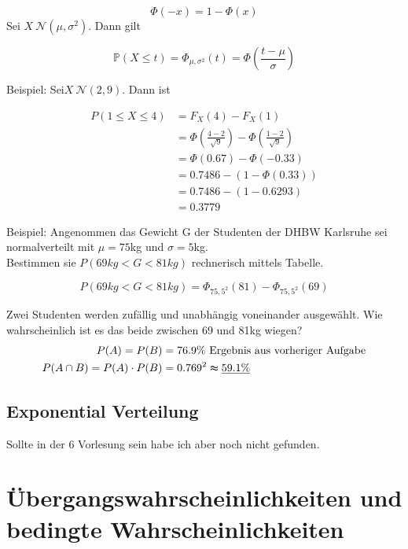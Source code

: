 \[\Phi(-x)=1-\Phi(x)\]
Sei $X~\mathcal{N} (\mu,\sigma^2)$. Dann gilt

\[\mathbb{P} (X\leq t)=\Phi_{\mu ,\sigma ^2}(t)=\Phi\left( \frac{t-\mu}{\sigma} \right)\]

Beispiel: Sei$X~\mathcal{N} (2,9)$. Dann ist

\begin{align}
    P(1\leq X\leq 4)&=F_X(4)-F_X(1)\\
    &=\Phi\left(\frac{4-2}{\sqrt{9}}\right)-\Phi\left(\frac{1-2}{\sqrt{9} } \right)\\
    &=\Phi(0.67)-\Phi(-0.33)\\
    &=0.7486-(1-\Phi(0.33))\\
    &=0.7486-(1-0.6293)\\
    &=0.3779
\end{align}

Beispiel: Angenommen das Gewicht G der Studenten der DHBW Karlsruhe sei normalverteilt mit $\mu =75$kg und $\sigma=5$kg.\\

Bestimmen sie $P(69kg<G<81kg)$ rechnerisch mittels Tabelle.

\[P(69kg<G<81kg)=\Phi_{75,5^2}(81)-\Phi_{75,5^2}(69)\]

Zwei Studenten werden zufällig und unabhängig voneinander ausgewählt. Wie wahrscheinlich ist es das beide zwischen 69 und 81kg wiegen?
\begin{align}
    P(A)=P(B)&=76.9\%\textrm{ Ergebnis aus vorheriger Aufgabe}\\
    P(A\cap B)=P(A)\cdot P(B)&=0.769^2\thickapprox \underline{59.1\% }
\end{align}


\subsection{Exponential Verteilung}

Sollte in der 6 Vorlesung sein habe ich aber noch nicht gefunden.

\section{Übergangswahrscheinlichkeiten und bedingte Wahrscheinlichkeiten}
